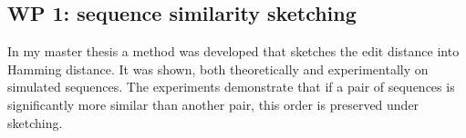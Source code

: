 

\subsection{WP 1: sequence similarity sketching}
In my master thesis a method was developed that sketches the edit distance into Hamming distance. It was shown, both theoretically and experimentally on simulated sequences. The experiments demonstrate that if a pair of sequences is significantly more similar than another pair, this order is preserved under sketching. 